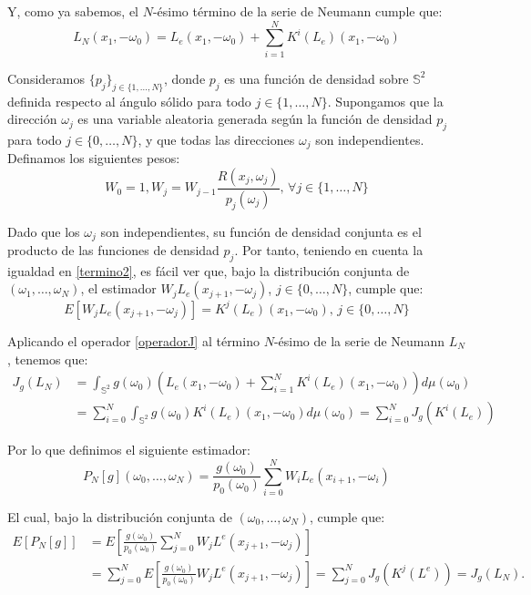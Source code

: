 Y, como ya sabemos, el $N$-ésimo término de la serie de Neumann cumple que:
\begin{equation}\label{termino}
 L_N(x_1, -\omega_0) = L_e(x_1,-\omega_0) + \sum_{i=1}^NK^i(L_e)(x_1, -\omega_0)
\end{equation}

Consideramos $\{p_j\}_{j\in\{1,\ldots ,N\}}$, donde $p_j$ es una función de densidad sobre $\mathds{S}^2$ definida respecto al ángulo sólido para todo $j\in\{1,\ldots,N\}$. Supongamos que la dirección $\omega_j$ es una variable aleatoria generada según la función de densidad $p_j$ para todo $j\in\{0,\ldots,N\}$, y que todas las direcciones $\omega_j$ son independientes. Definamos los siguientes pesos:
$$W_0=1, W_j=W_{j-1}\frac{R(x_j,\omega_j)}{p_j(\omega_j)}\text{, } \forall j\in\{1,\ldots,N\}$$

Dado que los $\omega_j$ son independientes, su función de densidad conjunta es el producto de las funciones de densidad $p_j$. Por tanto, teniendo en cuenta la igualdad en \ref{termino2}, es fácil ver que, bajo la distribución conjunta de $(\omega_1,\ldots ,\omega_N)$, el estimador $W_jL_e(x_{j+1},-\omega_j)$, $j\in\{0,\ldots,N\}$, cumple que:
\begin{equation}\label{EspKLe}
  E[W_jL_e(x_{j+1},-\omega_j)] = K^j(L_e)(x_1, -\omega_0)\text{, } j\in\{0,\ldots,N\}
\end{equation}

Aplicando el operador \ref{operadorJ} al término $N$-ésimo de la serie de Neumann $L_N$, tenemos que:
\begin{align*}
  J_g(L_N)&=\int_{\mathds{S}^2}g(\omega_0)(L_e(x_1,-\omega_0) + \sum_{i=1}^NK^i(L_e)(x_1, -\omega_0))d\mu(\omega_0)\\
  &=\sum_{i=0}^N\int_{\mathds{S}^2}g(\omega_0)K^i(L_e)(x_1, -\omega_0)d\mu(\omega_0) = \sum_{i=0}^NJ_g(K^i(L_e))
\end{align*}

Por lo que definimos el siguiente estimador:
\begin{equation}\label{estPN}
  P_N[g](\omega_0,\ldots ,\omega_N) = \frac{g(\omega_0)}{p_0(\omega_0)}\sum_{i=0}^NW_iL_e(x_{i+1},-\omega_i)
  \end{equation}

El cual, bajo la distribución conjunta de $(\omega_0,\ldots ,\omega_N)$, cumple que:
\begin{align*}
E[P_N[g]]&=E[\frac{g(\omega_0)}{p_0(\omega_0)}\sum_{j=0}^{N}W_jL^e(x_{j+1},-\omega_j)]\\
&=\sum_{j=0}^{N}E[\frac{g(\omega_0)}{p_0(\omega_0)}W_jL^e(x_{j+1},-\omega_j)]=\sum_{j=0}^{N}J_g(K^j(L^e))=J_g(L_N).
\end{align*}

